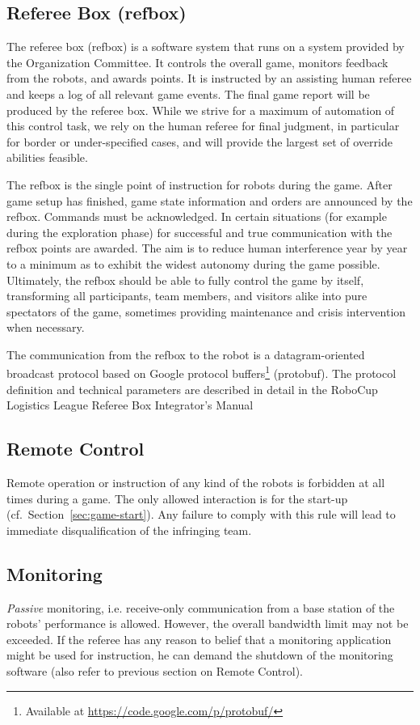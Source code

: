 \documentclass[12pt,twoside]{article}
\newcommand{\refsec}[1]{Section~\ref{#1}}
\begin{document}
\subsection{Referee Box (refbox)}
\label{sec:referee-box}
The referee box (refbox) is a software system that runs on a system
provided by the Organization Committee. It controls the overall game,
monitors feedback from the robots, and awards points. It is instructed
by an assisting human referee and keeps a log of all relevant game
events. The final game report will be produced by the referee
box. While we strive for a maximum of automation of this control task,
we rely on the human referee for final judgment, in particular for
border or under-specified cases, and will provide the largest set of
override abilities feasible.

The refbox is the single point of instruction for robots during the
game. After game setup has finished, game state information and orders
are announced by the refbox. Commands must be acknowledged. In certain
situations (for example during the exploration phase) for successful
and true communication with the refbox points are awarded. The aim is
to reduce human interference year by year to a minimum as to exhibit
the widest autonomy during the game possible. Ultimately, the refbox
should be able to fully control the game by itself, transforming all
participants, team members, and visitors alike into pure spectators of
the game, sometimes providing maintenance and crisis intervention when
necessary.

The communication from the refbox to the robot is a datagram-oriented
broadcast protocol based on Google protocol buffers\footnote{Available
  at \url{https://code.google.com/p/protobuf/}} (protobuf). The
protocol definition and technical parameters are described in detail
in the RoboCup Logistics League Referee Box Integrator's
Manual~\cite{RefBoxIntManual}

\subsection{Remote Control}
\label{sec:remote-control}
Remote operation or instruction of any kind of the robots is forbidden
at all times during a game. The only allowed interaction is for the
start-up (cf.~\refsec{sec:game-start}). Any failure to comply with
this rule will lead to immediate disqualification of the infringing
team.

\subsection{Monitoring}
\label{sec:monitoring}
\emph{Passive} monitoring, i.e. receive-only communication from a base
station of the robots' performance is allowed. However, the overall
bandwidth limit may not be exceeded.
If the referee has any reason to belief that a monitoring application
might be used for instruction, he can demand the shutdown of the
monitoring software (also refer to previous section on Remote
Control).
\end{document}
